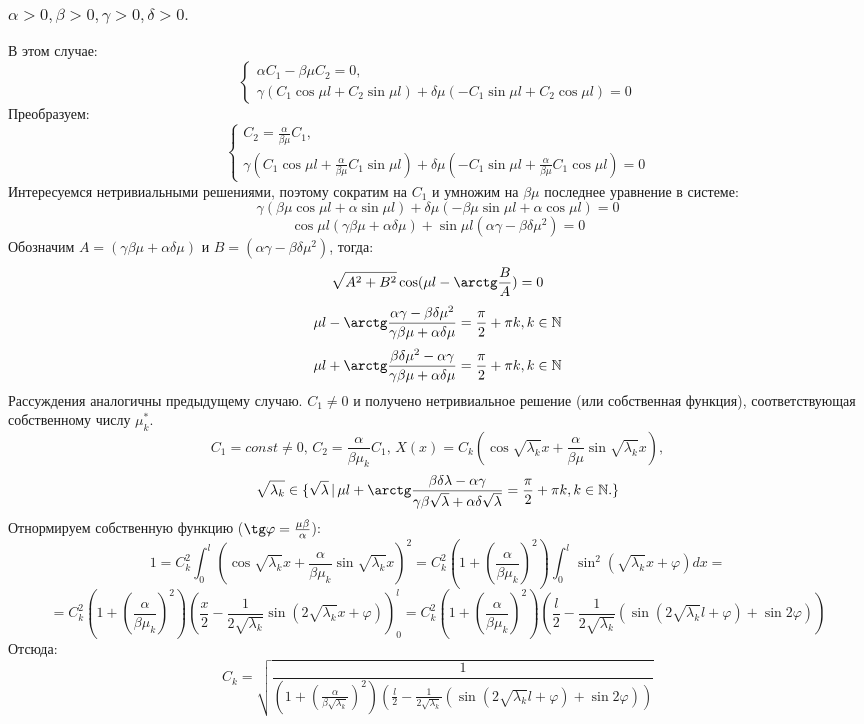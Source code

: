 \documentclass[12pt, a4paper]{article}
\begin{document}
\subsubsection{ $ \alpha > 0, \beta > 0, \gamma > 0, \delta > 0. $}
В этом случае:
\begin{displaymath}
	\begin{cases}
		\alpha C_{1} - \beta \mu C_{2} = 0, \\
		\gamma (C_{1} \cos \mu l + C_{2} \sin \mu l) + \delta \mu ( -C_{1} \sin \mu l + C_{2} \cos \mu l) = 0
	\end{cases}
\end{displaymath}
Преобразуем:
\begin{displaymath}
	\begin{cases}
		C_{2} = \frac{\alpha}{\beta \mu} C_{1}, \\
		\gamma (C_{1} \cos \mu l + \frac{\alpha}{\beta \mu} C_{1} \sin \mu l) + \delta \mu ( -C_{1} \sin \mu l + \frac{\alpha}{\beta \mu} C_{1} \cos \mu l) = 0
	\end{cases}
\end{displaymath}
Интересуемся нетривиальными решениями, поэтому сократим на $C_{1}$ и умножим на $\beta \mu$ последнее уравнение в системе:
\[ \gamma (\beta \mu \cos \mu l + \alpha \sin \mu l) + \delta \mu ( - \beta \mu \sin \mu l + \alpha \cos \mu l) = 0 \]
\[ \cos \mu l (\gamma \beta \mu + \alpha \delta \mu) + \sin \mu l (\alpha \gamma - \beta \delta \mu^2) = 0 \]
Обозначим $ A = (\gamma \beta \mu + \alpha \delta \mu) $ и $ B = (\alpha \gamma - \beta \delta \mu^2) $, тогда:
\[ \sqrt{A^2 + B^2} \cos (\mu l - \arctg \frac{B}{A}) = 0 \]
\[ \mu l - \arctg \frac{\alpha \gamma - \beta \delta \mu^2}{\gamma \beta \mu + \alpha \delta \mu} = \frac{\pi}{2} + \pi k, k \in \mathbb{N} \]
\[ \mu l + \arctg \frac{\beta \delta \mu^2 - \alpha \gamma}{\gamma \beta \mu + \alpha \delta \mu} = \frac{\pi}{2} + \pi k, k \in \mathbb{N} \]
Рассуждения аналогичны предыдущему случаю. $C_{1} \ne 0$ и получено нетривиальное решение (или собственная функция), соответствующая собственному числу $\mu ^{*}_{k}$. 
\[ C_{1} = const \ne 0, \, C_{2} = \frac{\alpha}{\beta \mu_{k}} C_{1}, \, X(x) = C_{k} (\cos \sqrt{\lambda_{k}} x + \frac{\alpha}{\beta \mu} \sin \sqrt{\lambda_{k}} x), \]
\[ \sqrt{\lambda_{k}} \in \{ \sqrt{\lambda} \, | \, \mu l + \arctg \frac{\beta \delta \lambda - \alpha \gamma}{\gamma \beta \sqrt{\lambda} + \alpha \delta \sqrt{\lambda}} = \frac{\pi}{2} + \pi k, k \in \mathbb{N}. \} \]
Отнормируем собственную функцию ($\tg \varphi = \frac{\mu \beta}{\alpha}$):
\[ 1 = C_{k}^2 \int_{0}^{l} (\cos \sqrt{\lambda_{k}} x + \frac{\alpha}{\beta \mu_{k}} \sin \sqrt{\lambda_{k}} x)^2 = C_{k}^2 (1 + (\frac{\alpha}{\beta \mu_{k}})^2) \int_{0}^{l} \sin^2 (\sqrt{\lambda_{k}}x + \varphi) dx = \]
\[ = C_{k}^2 (1 + (\frac{\alpha}{\beta \mu_{k}})^2) (\frac{x}{2} - \frac{1}{2\sqrt{\lambda_{k}}} \sin (2\sqrt{\lambda_{k}}x + \varphi))_{0}^{l} = C_{k}^2 (1 + (\frac{\alpha}{\beta \mu_{k}})^2) (\frac{l}{2} - \frac{1}{2\sqrt{\lambda_{k}}} (\sin (2\sqrt{\lambda_{k}}l + \varphi) + \sin 2\varphi))\]
Отсюда:
\[ C_{k} = \sqrt{\frac{1}{(1 + (\frac{\alpha}{\beta \sqrt{\lambda_{k}}})^2) (\frac{l}{2} - \frac{1}{2\sqrt{\lambda_{k}}} (\sin (2\sqrt{\lambda_{k}}l + \varphi) + \sin 2\varphi))}} \]
\end{document}
